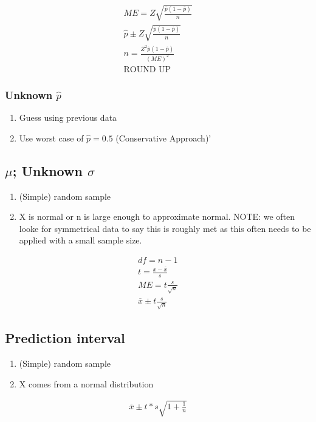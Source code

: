 \begin{align}
  ME = Z\sqrt{\frac{\hat{p}(1-\hat{p})}{n}} \\
  \hat{p} \pm Z\sqrt{\frac{\hat{p}(1-\hat{p})}{n}} \\
  n = \frac{Z^2\hat{p}(1 - \hat{p})}{(ME)^2} \\
  \text{ROUND UP}
\end{align}

\subsubsection{Unknown $\hat{p}$}
\begin{enumerate}
\item Guess using previous data
\item Use worst case of $\hat{p} = 0.5$ (Conservative Approach)'
\end{enumerate}

\subsection{$\mu$; Unknown $\sigma$}
\begin{enumerate}
\item (Simple) random sample
\item X is normal or n is large enough to approximate normal. NOTE: we often looke for symmetrical data to say this is roughly met as this often needs to be applied with a small sample size.
\end{enumerate}

\begin{align}
  df = n - 1 \\
  t = \frac{x - \overbar{x}}{s} \\
  ME = t\frac{s}{\sqrt{n}} \\
  \overbar{x} \pm t\frac{s}{\sqrt{n}}
\end{align}

\subsection{Prediction interval}
\begin{enumerate}
\item (Simple) random sample
\item X comes from a normal distribution
\end{enumerate}

\begin{align}
  \overbar{x} \pm t * s\sqrt{1 + \frac{1}{n}}
\end{align}


